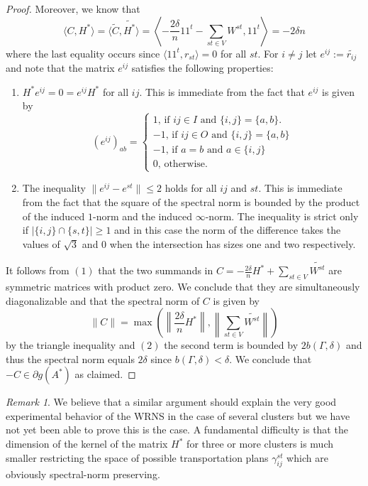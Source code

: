 \documentclass[12pt]{amsart}
\theoremstyle{remark}
\newtheorem{remark}[lemma]{Remark}
\begin{document}
\begin{proof}
Moreover, we know that
\[\langle C, H^*\rangle = \langle \widetilde{C}, \widetilde{H^*}\rangle = \left\langle -\frac{2\delta}{n}11^t-\sum_{st\in V} W^{st}, 11^t\right\rangle = -2\delta n\] 
where the last equality occurs since $\langle 11^t, r_{st}\rangle =0$ for all $st$. For $i\neq j$ let $e^{ij}:=\widetilde{r_{ij}}$ and note that the matrix $e^{ij}$ satisfies the following  properties:
\begin{enumerate}
\item  $H^*e^{ij}=0=e^{ij}H^*$ for all $ij$. This is immediate from the fact that $e^{ij}$ is given by
\[
(e^{ij})_{ab}=\begin{cases}
1 \text{, if $ij\in I$ and $\{i,j\}=\{a,b\}$} . \\
-1 \text{, if $ij\in O$ and $\{i,j\}=\{a,b\}$} \\
-1 \text{, if $a=b$ and $a\in \{i,j\}$}\\
0 \text{, otherwise}. 
\end{cases}
\]
 
\item The inequality $\|e^{ij}-e^{st}\|\leq 2$ holds for all $ij$ and $st$. This is immediate from the fact that the square of the spectral norm is bounded by the product of the induced $1$-norm and the induced $\infty$-norm. The inequality is strict only if $|\{i,j\}\cap\{s,t\}|\geq 1$ and in this case the norm of the difference takes the values of $\sqrt{3}$ and $0$ when the intersection has sizes one and two respectively.   
\end{enumerate}
It follows from $(1)$ that the two summands in $C=-\frac{2\delta}{n}H^* +\sum_{st\in V} \widetilde{W^{st}}$ are symmetric matrices with product zero. We conclude that they are simultaneously diagonalizable and that the spectral norm of $C$ is given by
\[\|C\|=\max\left(\left\|\frac{2\delta}{n}H^*\right\|, \left\|\sum_{st\in V} \widetilde{W^{st}}\right\|\right)\]
by the triangle inequality and $(2)$ the second term is bounded by $2b(\Gamma,\delta)$ and thus the spectral norm equals $2\delta$ since $b(\Gamma,\delta)<\delta$. We conclude that $-C\in \partial g(A^*)$ as claimed.
\end{proof}

\begin{remark} We believe that a similar argument should explain the very good experimental behavior of the WRNS in the case of several clusters but we have not yet been able to prove this is the case. A fundamental difficulty is that the dimension of the kernel of the matrix $H^*$ for three or more clusters is much smaller restricting the space of possible transportation plans $\gamma_{ij}^{st}$ which are obviously spectral-norm preserving.
\end{remark}
\end{document}
